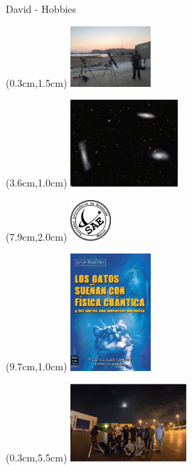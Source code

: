 \documentclass{beamer}
\begin{document}
\begin{frame}{David - Hobbies}
   \begin{textblock*}{\textwidth}(0.3cm,1.5cm) %
      \includegraphics[width=3.0cm]{figures/sae_david.png}
   \end{textblock*}
   \begin{textblock*}{\textwidth}(3.6cm,1.0cm) %
      \includegraphics[width=4.0cm]{figures/galaxy.png}
   \end{textblock*}
   \begin{textblock*}{\textwidth}(7.9cm,2.0cm) %
      \includegraphics[width=1.5cm]{figures/sae_logo.png}
   \end{textblock*}
   \begin{textblock*}{\textwidth}(9.7cm,1.0cm) %
      \includegraphics[width=3.0cm]{figures/gatos.jpg}
   \end{textblock*}
   \begin{textblock*}{\textwidth}(0.3cm,5.5cm) %
      \includegraphics[width=4.3cm]{figures/sae_group.png}

\end{textblock*}
\end{frame}
\end{document}
